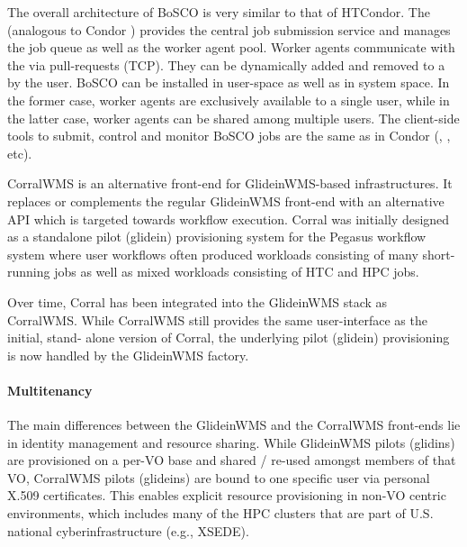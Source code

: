\documentclass{sig-alternate}
\begin{document}
The overall architecture of BoSCO is very similar to that of HTCondor. The
 (analogous to Condor ) provides the
central job submission service and manages the job queue as well as the worker
agent pool. Worker agents communicate with the  via
pull-requests (TCP). They can be dynamically added and removed to a
 by the user. BoSCO can be installed in user-space
as well as in system space. In the former case, worker agents are exclusively
available to a single user, while in the latter case, worker agents can be
shared among multiple users. The client-side tools to submit, control and
monitor BoSCO jobs are the same as in Condor (,
, etc).

CorralWMS is an alternative front-end for GlideinWMS-based
infrastructures. It replaces or complements the regular GlideinWMS front-end
with an alternative API which is targeted towards workflow execution. Corral was
initially designed as a standalone pilot (glidein) provisioning system for
the Pegasus workflow system where user  workflows often produced workloads
consisting of many short-running jobs as well as mixed workloads consisting of
HTC and HPC jobs.

Over time, Corral has been integrated into the GlideinWMS stack as CorralWMS.
While CorralWMS still provides the same user-interface as the initial, stand-
alone version of Corral, the underlying pilot (glidein) provisioning is
now handled by the GlideinWMS factory.

\paragraph{Multitenancy}

The main differences between the GlideinWMS and the CorralWMS front-ends lie in
identity management and resource sharing.
While GlideinWMS pilots (glidins) are provisioned on a per-VO base and shared /
re-used amongst members of that VO, CorralWMS pilots (glideins) are bound to
one specific user via personal X.509 certificates.
This enables explicit resource provisioning in non-VO centric environments,
which includes many of the HPC clusters that are part of U.S. national
cyberinfrastructure (e.g., XSEDE).
\end{document}

